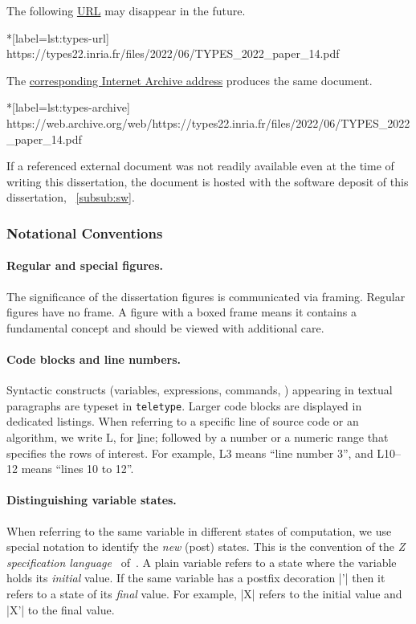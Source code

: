 \begin{example}
The following \href{https://types22.inria.fr/files/2022/06/TYPES_2022_paper_14.pdf}{URL} may disappear in the future.
\begin{cmdlisting}*[label={lst:types-url}]
https://types22.inria.fr/files/2022/06/TYPES_2022_paper_14.pdf
\end{cmdlisting}

The \href{https://web.archive.org/web/https://types22.inria.fr/files/2022/06/TYPES_2022_paper_14.pdf}{corresponding Internet Archive address} produces the same document.
\begin{cmdlisting}*[label={lst:types-archive}]
https://web.archive.org/web/https://types22.inria.fr/files/2022/06/TYPES_2022_paper_14.pdf
\end{cmdlisting}

\end{example}

If a referenced external document was not readily available even at the time of writing this dissertation,
the document is hosted with the software deposit of this dissertation, \cf~\autoref{subsub:sw}.

\subsubsection{Notational Conventions}

\paragraph*{Regular and special figures.}
The significance of the dissertation figures is communicated via framing.
Regular figures have no frame.
A figure with a boxed frame means it contains a fundamental concept and should be viewed with additional care.

\paragraph*{Code blocks and line numbers.}
Syntactic constructs (variables, expressions, commands, \etc) appearing in textual paragraphs are typeset in \texttt{teletype}.
Larger code blocks are displayed in dedicated listings.
When referring to a specific line of source code or an algorithm, we write L, for \underline{l}ine;
followed by a number or a numeric range that specifies the rows of interest.
For example, L3 means \enquote{line number 3}, and L10--12 means \enquote{lines 10 to 12}.

\paragraph*{Distinguishing variable states.}
When referring to the same variable in different states of computation, we use special notation to identify the \emph{new} (post) states.
This is the convention of the \emph{Z specification language}~\cite[p. 34]{furia2014} of~\textcite{spivey1992}.
A plain variable refers to a state where the variable holds its \emph{initial} value.
If the same variable has a postfix decoration \pr|'| then it refers to a state of its \emph{final} value.
For example, \pr|X| refers to the initial value and \pr|X'| to the final value.
